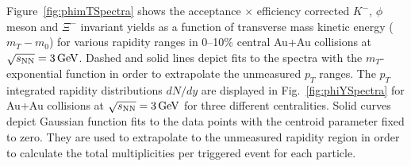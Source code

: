 \documentclass[%
 reprint,	
showpacs,
 amsmath,amssymb,
 aps,
 superscriptaddress,
]{revtex4-1}
\begin{document}
Figure~\ref{fig:phimTSpectra} shows the acceptance $\times$ efficiency corrected $K^-$, $\phi$ meson and $\Xi^-$ invariant yields as a function of transverse mass kinetic energy ($m_T-m_0$) for various rapidity ranges in 0--10\% central Au+Au collisions at ${\sqrt{s_{\rm NN}} = \rm{3\,GeV}}$. %
Dashed and solid lines depict fits to the spectra with the $m_T$-exponential function in order to extrapolate the unmeasured $p_T$ ranges. 
The $p_T$ integrated rapidity distributions $dN/dy$ are displayed in Fig.~\ref{fig:phiYSpectra} for Au+Au collisions at ${\sqrt{s_{\rm NN}} = \rm{3\,GeV}}$ for three different centralities. %
Solid curves depict Gaussian function fits to the data points with the centroid parameter fixed to zero. They are used to extrapolate to the unmeasured rapidity region in order to calculate the total multiplicities per triggered event for each particle.
\end{document}
